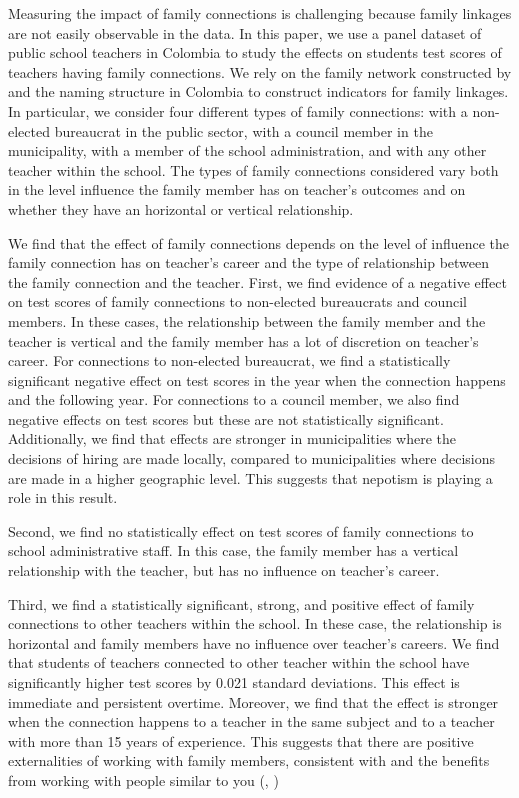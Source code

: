 \documentclass[12pt,runningheads]{article}
\begin{document}
Measuring the impact of family connections is challenging because family linkages are not easily observable in the data. In this paper, we use a panel dataset of public school teachers in Colombia to study the effects on students test scores of teachers having family connections.  We rely on the family network constructed by \cite{Riano2021} and the naming structure in Colombia to construct indicators for family linkages. In particular, we consider four different types of family connections: with a non-elected bureaucrat in the public sector, with a council member in the municipality, with a member of the school administration, and with any other teacher within the school. The types of family connections considered vary both in the level influence the family member has on teacher's outcomes and on whether they have an horizontal or vertical relationship. 

We find that the effect of family connections depends on the level of influence the family connection has on teacher's career and the type of relationship between the family connection and the teacher. First, we find evidence of a negative effect on test scores of family connections to non-elected bureaucrats and council members. In these cases, the relationship between the family member and the teacher is vertical and the family member has a lot of discretion on teacher's career. For connections to non-elected bureaucrat, we find a statistically significant negative effect on test scores in the year when the connection happens and the following year. For connections to a council member, we also find negative effects on test scores but these are not statistically significant. Additionally, we find that effects are stronger in municipalities where the decisions of hiring are made locally, compared to municipalities where decisions are made in a higher geographic level. This suggests that nepotism is playing a role in this result.

Second, we find no statistically effect on test scores of family connections to school administrative staff. In this case, the family member has a vertical relationship with the teacher, but has no influence on teacher's career. 

Third, we find a statistically significant, strong, and positive effect of family connections to other teachers within the school. In these case, the relationship is horizontal and family members have no influence over teacher's careers. We find that students of teachers connected to other teacher within the school have significantly higher test scores by 0.021 standard deviations. This effect is immediate and persistent overtime. Moreover, we find that the effect is stronger when the connection happens to a teacher in the same subject and to a teacher with more than 15 years of experience. This suggests that there are positive externalities of working with family members, consistent with \cite{Parker2008} and the benefits from working with people similar to you (, )
\end{document}
